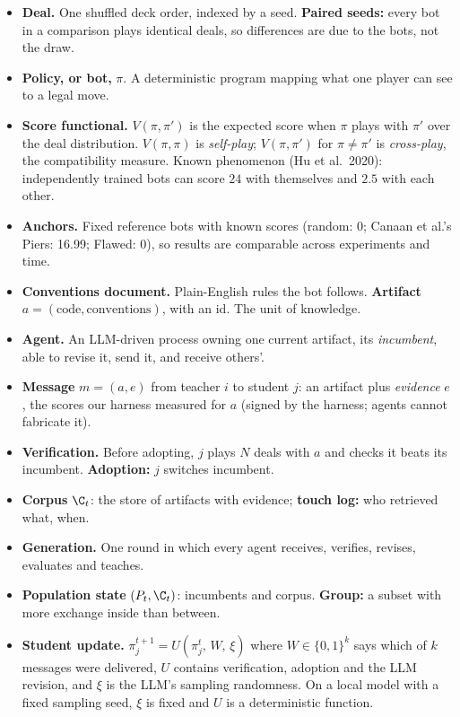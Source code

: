 \documentclass[11pt]{article}
\begin{document}
\begin{itemize}
\item \textbf{Deal.} One shuffled deck order, indexed by a seed. \textbf{Paired seeds:} every bot in a comparison
plays identical deals, so differences are due to the bots, not the draw.
\item \textbf{Policy, or bot,} $\pi$. A deterministic program mapping what one player can see to a legal move.
\item \textbf{Score functional.} $V(\pi,\pi')$ is the expected score when $\pi$ plays with $\pi'$ over the deal
distribution. $V(\pi,\pi)$ is \emph{self-play}; $V(\pi,\pi')$ for $\pi\ne\pi'$ is \emph{cross-play}, the
compatibility measure. Known phenomenon (Hu et al.\ 2020): independently trained bots can score $24$ with
themselves and $2.5$ with each other.
\item \textbf{Anchors.} Fixed reference bots with known scores (random: 0; Canaan et al.'s Piers: 16.99; Flawed: 0),
so results are comparable across experiments and time.
\item \textbf{Conventions document.} Plain-English rules the bot follows. \textbf{Artifact} $a=(\text{code},
\text{conventions})$, with an id. The unit of knowledge.
\item \textbf{Agent.} An LLM-driven process owning one current artifact, its \emph{incumbent}, able to revise it,
send it, and receive others'.
\item \textbf{Message} $m=(a,e)$ from teacher $i$ to student $j$: an artifact plus \emph{evidence} $e$, the scores
our harness measured for $a$ (signed by the harness; agents cannot fabricate it).
\item \textbf{Verification.} Before adopting, $j$ plays $N$ deals with $a$ and checks it beats its incumbent.
\textbf{Adoption:} $j$ switches incumbent.
\item \textbf{Corpus} $\C_t$: the store of artifacts with evidence; \textbf{touch log:} who retrieved what, when.
\item \textbf{Generation.} One round in which every agent receives, verifies, revises, evaluates and teaches.
\item \textbf{Population state} $(P_t,\C_t)$: incumbents and corpus. \textbf{Group:} a subset with more exchange
inside than between.
\item \textbf{Student update.} $\pi_j^{t+1}=U(\pi_j^t,\,W,\,\xi)$ where $W\in\{0,1\}^k$ says which of $k$ messages
were delivered, $U$ contains verification, adoption and the LLM revision, and $\xi$ is the LLM's sampling
randomness. On a local model with a fixed sampling seed, $\xi$ is fixed and $U$ is a deterministic function.
\end{itemize}
\end{document}
